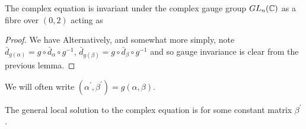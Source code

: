 \documentclass{article}
\begin{document}
\begin{lemma}
	The complex equation is invariant under the complex gauge group $GL_n(\mathbb{C})$ as a fibre over $(0,2)$ acting as 
\end{lemma}
\begin{proof}
	We have 
Alternatively, and somewhat more simply, note $\bar{d}_{g(\alpha)} = g \circ \bar{d}_\alpha \circ g^{-1}, \, \bar{d}_{g(\beta)} = g \circ \bar{d}_\beta \circ g^{-1}$ and so gauge invariance is clear from the previous lemma. 
\end{proof}

\begin{notation}
	We will often write $(\alpha^\prime, \beta^\prime) = g(\alpha,\beta)$. 
\end{notation}

\begin{prop}
	The general local solution to the complex equation is 
	for some constant matrix $\beta^\prime$. 
\end{prop}
\end{document}
